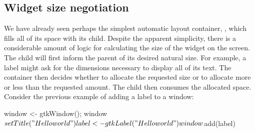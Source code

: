 \subsection{Widget size negotiation}
\label{sec:RGtk2:layout:size}

We have already seen perhaps the simplest automatic layout container,
, which fills all of its space with its
child. Despite the apparent simplicity, there is a considerable amount
of logic for calculating the size of the widget on the screen. The
child will first inform the parent of its desired natural size. For
example, a label might ask for the dimensions necessary to display all
of its text. The container then decides whether to allocate the
requested size or to allocate more or less than the requested
amount. The child then consumes the allocated space. Consider the
previous example of adding a label to a window:
\begin{Schunk}
\begin{Sinput}
 window <- gtkWindow(); window$setTitle("Hello world")
 label <- gtkLabel("Hello world")
 window$add(label)
\end{Sinput}
\end{Schunk}

